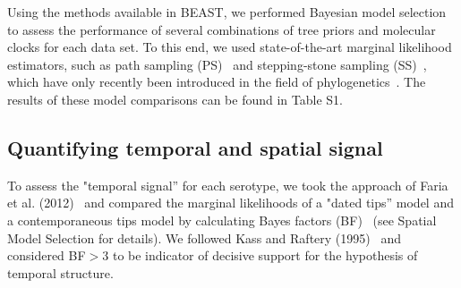 \documentclass[10pt]{article}
\begin{document}
Using the methods available in BEAST, we performed Bayesian model selection to assess the performance of several combinations of tree priors and molecular clocks for each data set.
To this end, we used state-of-the-art marginal likelihood estimators, such as path sampling (PS)~\cite{LartillotPhilippe} and stepping-stone sampling (SS)~\cite{Xie}, which have only recently been introduced in the field of phylogenetics~\cite{LartillotPhilippe,Xie,Baele2012,Baele2013a,Baele2013b}.
The results of these model comparisons can be found in Table S1.

\subsection*{Quantifying temporal and spatial signal} 

To assess the "temporal signal'' for each serotype, we took the approach of Faria et al. (2012)~\cite{Faria2012} and compared the marginal likelihoods of a "dated tips'' model and a contemporaneous tips model by calculating Bayes factors (BF)~\cite{Suchard2001,KassRaftery1995} (see Spatial Model Selection for details).
We followed Kass and Raftery (1995)~\cite{KassRaftery1995} and considered BF$>$3 to be indicator of decisive support for the hypothesis of temporal structure.
\end{document}
